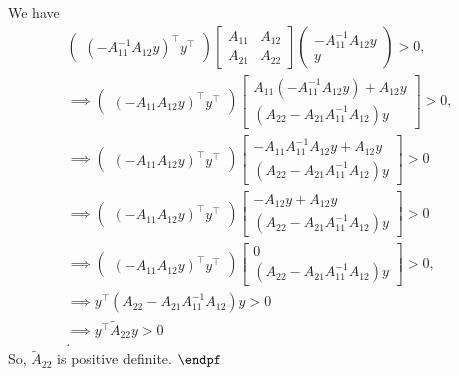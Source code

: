 \documentclass{report}
\begin{document}
\begin{remark}
    We have
    \begin{align*}
        \begin{pmatrix} (-A_{11}^{-1}A_{12}y)^{\top} y^{\top} \end{pmatrix} \begin{bmatrix} A_{11} & A_{12} \\ A_{21} & A_{22} \end{bmatrix} \begin{pmatrix} -A_{11}^{-1}A_{12}y \\ y \end{pmatrix} > 0 , \\
        \implies \begin{pmatrix} (-A_{11}A_{12}y)^{\top} y^{\top} \end{pmatrix} \begin{bmatrix} A_{11}(-A_{11}^{-1}A_{12}y) + A_{12}y \\ (A_{22}-A_{21}A_{11}^{-1}A_{12})y \end{bmatrix} >0, \\
        \implies \begin{pmatrix} (-A_{11}A_{12}y)^{\top} y^{\top} \end{pmatrix} \begin{bmatrix} -A_{11}A_{11}^{-1}A_{12}y + A_{12}y \\ (A_{22}-A_{21}A_{11}^{-1}A_{12})y \end{bmatrix} >0 \\
        \implies \begin{pmatrix} (-A_{11}A_{12}y)^{\top} y^{\top} \end{pmatrix} \begin{bmatrix} -A_{12}y + A_{12}y \\ (A_{22}-A_{21}A_{11}^{-1}A_{12})y \end{bmatrix} >0 \\
        \implies \begin{pmatrix} (-A_{11}A_{12}y)^{\top} y^{\top} \end{pmatrix} \begin{bmatrix} 0 \\ (A_{22}-A_{21}A_{11}^{-1}A_{12})y \end{bmatrix} >0, \\
        \implies y^{\top}(A_{22}-A_{21}A_{11}^{-1}A_{12})y >0 \\
        \implies y^{\top}\tilde{A}_{22}y > 0 \\
    .\end{align*}
    So, $\tilde{A}_{22}$ is positive definite. $\endpf $


\end{remark}
\end{document}
